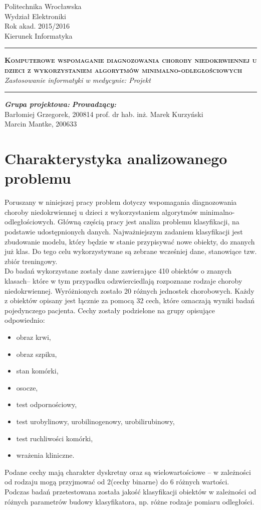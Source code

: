 \documentclass[11pt, a4paper, titlepage]{report}
\date{Wrocław, 06.06.2016}
\makeatletter
\renewcommand{\maketitle}{\begin{titlepage}
		\begin{center}\small
			Politechnika Wrocławska\\
			Wydział Elektroniki\\
			Rok akad. 2015/2016\\
			Kierunek Informatyka\\
			\vspace{3cm}
			\rule{\linewidth}{0.4pt}
				\huge \textsc{\textbf{Komputerowe wspomaganie diagnozowania choroby niedokrwiennej u dzieci z wykorzystaniem algorytmów minimalno-odległościowych}}
				\vspace{0.5cm} \\
				\normalsize \textit{Zastosowanie informatyki w medycynie: Projekt}
			\rule{\linewidth}{0.4pt}
		\end{center}

		\vspace{3cm}
		\begin{flushleft}
			\textbf{\textit{Grupa projektowa:}} \hspace{6.5cm} \textbf{\textit{Prowadzący:}} \\
			Barłomiej Grzegorek, 200814 \hfill{prof. dr hab. inż. Marek Kurzyński} \\
			Marcin Mantke, 200633\\
			\vspace{2cm}
		\end{flushleft}
		\vspace*{\stretch{6}}
		\begin{center}
			\@date
		\end{center}
	\end{titlepage}%
}
\makeatother
\begin{document}
\maketitle
\tableofcontents
\cleardoublepage
{}
{}
\listoffigures

\cleardoublepage
{}
{}
\lstlistoflistings
\chapter{Charakterystyka analizowanego problemu}
\label{chap:Charakterystyka analizowanego problemu}
Poruszany w niniejszej pracy problem dotyczy wspomagania diagnozowania choroby niedokrwiennej u  dzieci z wykorzystaniem algorytmów minimalno-odległościowych. Główną częścią pracy jest analiza problemu klasyfikacji, na podstawie udostępnionych danych. Najważniejszym zadaniem klasyfikacji jest zbudowanie modelu, który będzie w stanie przypisywać nowe obiekty, do znanych już klas. Do tego celu wykorzystywane są zebrane wcześniej dane, stanowiące tzw. zbiór treningowy.\\

Do badań wykorzystane zostały dane zawierające 410 obiektów o znanych klasach– które w tym przypadku odzwierciedlają rozpoznane rodzaje choroby niedokrwiennej. Wyróżnionych zostało 20 różnych jednostek chorobowych. Każdy z obiektów opisany jest łącznie za pomocą 32 cech, które oznaczają wyniki badań pojedynczego pacjenta. Cechy zostały podzielone na grupy opisujące odpowiednio:
\begin{itemize}
  \item obraz krwi,
  \item obraz szpiku,
  \item stan komórki,
  \item osocze,
  \item test odpornościowy,
  \item test urobylinowy, urobilinogenowy, urobilirubinowy,
  \item test ruchliwości komórki,
  \item wrażenia kliniczne.
\end{itemize}

Podane cechy mają charakter dyskretny oraz są wielowartościowe – w zależności od rodzaju mogą przyjmować od 2(cechy binarne) do 6 różnych wartości.\\
Podczas badań przetestowana została jakość klasyfikacji obiektów w zależności od różnych parametrów budowy klasyfikatora, np. różne rodzaje pomiaru odległości.
\end{document}
